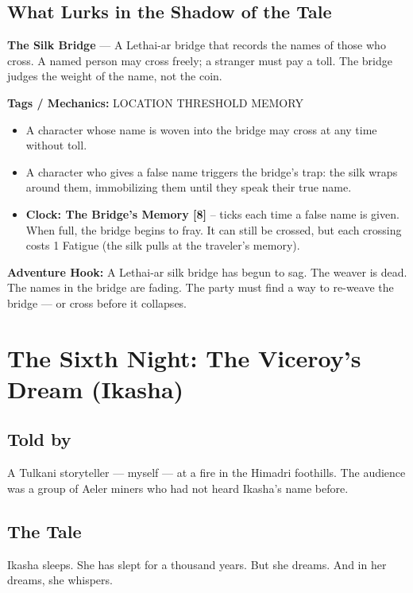 \documentclass[10pt,twoside]{book}
\newcommand{\tag}[1]{\textsc{#1}}
\begin{document}
\section*{What Lurks in the Shadow of the Tale}
\begin{infobox}
\textbf{The Silk Bridge} --- A Lethai-ar bridge that records the names of those who cross. A named person may cross freely; a stranger must pay a toll. The bridge judges the weight of the name, not the coin.

\textbf{Tags / Mechanics:} \tag{LOCATION} \tag{THRESHOLD} \tag{MEMORY}

\begin{itemize}
\item A character whose name is woven into the bridge may cross at any time without toll.
\item A character who gives a false name triggers the bridge's trap: the silk wraps around them, immobilizing them until they speak their true name.
\item \textbf{Clock: The Bridge's Memory [8]} -- ticks each time a false name is given. When full, the bridge begins to fray. It can still be crossed, but each crossing costs 1 Fatigue (the silk pulls at the traveler's memory).
\end{itemize}

\textbf{Adventure Hook:} A Lethai-ar silk bridge has begun to sag. The weaver is dead. The names in the bridge are fading. The party must find a way to re-weave the bridge --- or cross before it collapses.
\end{infobox}

\chapter{The Sixth Night: The Viceroy's Dream (Ikasha)}

\section*{Told by}
A Tulkani storyteller --- myself --- at a fire in the Himadri foothills. The audience was a group of Aeler miners who had not heard Ikasha's name before.

\section*{The Tale}
Ikasha sleeps. She has slept for a thousand years. But she dreams. And in her dreams, she whispers.
\end{document}

